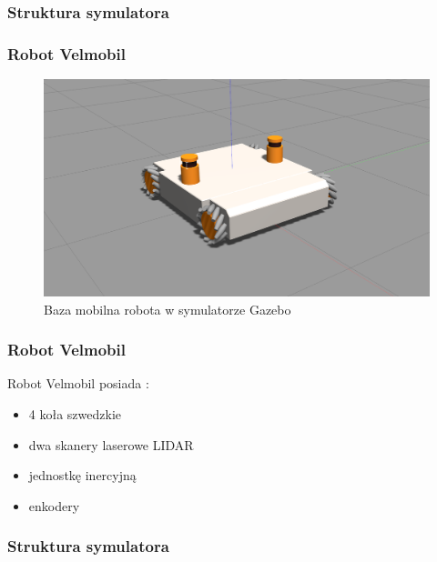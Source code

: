 
\begin{frame}
\frametitle{Struktura symulatora}

\end{frame}


\begin{frame}
\frametitle{Robot Velmobil}
\begin{figure}
\includegraphics[scale=0.20]{./images/omnivelma_gz.png}
\caption{Baza mobilna robota w symulatorze Gazebo}
\end{figure}
\end{frame}


\begin{frame}
\frametitle{Robot Velmobil}
Robot Velmobil posiada \cite{docsVelma}:  
\begin{itemize}
	\item 4 koła szwedzkie
	\item dwa skanery laserowe LIDAR
	\item jednostkę inercyjną
	\item enkodery %
\end{itemize}
\end{frame}


\begin{frame}
\frametitle{Struktura symulatora}

\end{frame}